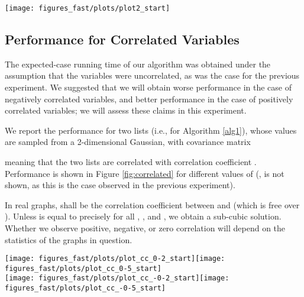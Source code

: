 \documentclass[a4paper,10pt]{article}
\begin{document}
\begin{figure*}
 \begin{center}
  \texttt{[image: figures\_fast/plots/plot2\_start]}\end{center}
\caption{Performance of our algorithm and bounds. For , the exact expectation is shown, which appears to precisely match the average performance (over 100 trials). The dotted lines show the upper-bound, which appears to be extremely close to the average performance, indicating that the bound is reasonably tight.}
\label{fig:exp1}
\end{figure*}



\subsection{Performance for Correlated Variables}

The expected-case running time of our algorithm was obtained under the assumption that the variables were uncorrelated, as was the case for the previous experiment. We suggested that we will obtain worse performance in the case of negatively correlated variables, and better performance in the case of positively correlated variables; we will assess these claims in this experiment.

We report the performance for two lists (i.e., for Algorithm \ref{alg1}), whose values are sampled from a 2-dimensional Gaussian, with covariance matrix

meaning that the two lists are correlated with correlation coefficient . Performance is shown in Figure \ref{fig:correlated} for different values of  (, is not shown, as this is the case observed in the previous experiment).

In real graphs,  shall be the correlation coefficient between  and  (which is free over ). Unless  is equal to precisely  for all , , and , we obtain a sub-cubic solution. Whether we observe positive, negative, or zero correlation will depend on the statistics of the graphs in question.

\begin{figure*}
 \begin{center}
  \texttt{[image: figures\_fast/plots/plot\_cc\_0-2\_start]}\texttt{[image: figures\_fast/plots/plot\_cc\_0-5\_start]}\\\texttt{[image: figures\_fast/plots/plot\_cc\_-0-2\_start]}\texttt{[image: figures\_fast/plots/plot\_cc\_-0-5\_start]}\end{center}
\caption{Performance of our algorithm for different correlation coefficients. The top three plots show positive correlation, the bottom three show negative correlation. Correlation coefficients of  and  capture precisely the best and worst-case performance (respectively) of our algorithm.}
\label{fig:correlated}
\end{figure*}
\end{document}
